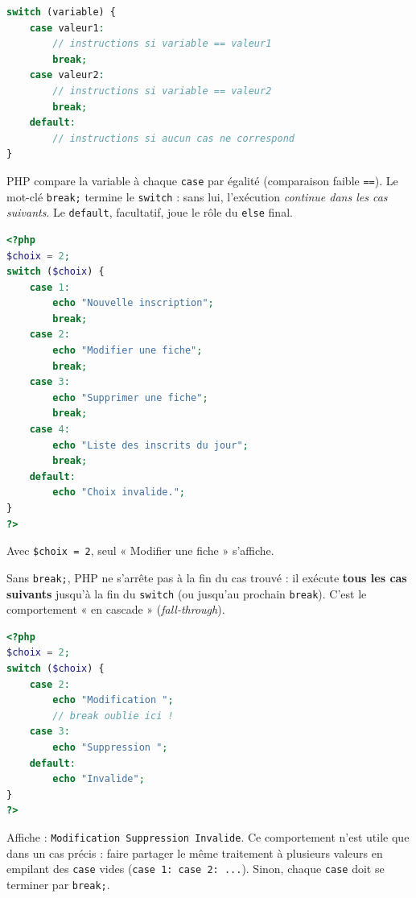 \documentclass[11pt]{article}
\begin{document}
\begin{propriete}
\begin{lstlisting}[language=Php]
switch (variable) {
    case valeur1:
        // instructions si variable == valeur1
        break;
    case valeur2:
        // instructions si variable == valeur2
        break;
    default:
        // instructions si aucun cas ne correspond
}
\end{lstlisting}
PHP compare la variable à chaque \texttt{case} par égalité (comparaison faible \texttt{==}). Le mot-clé \texttt{break;} termine le \texttt{switch} : sans lui, l'exécution \emph{continue dans les cas suivants}. Le \texttt{default}, facultatif, joue le rôle du \texttt{else} final.
\end{propriete}

\begin{exemplebox}
\begin{lstlisting}[language=Php]
<?php
$choix = 2;
switch ($choix) {
    case 1:
        echo "Nouvelle inscription";
        break;
    case 2:
        echo "Modifier une fiche";
        break;
    case 3:
        echo "Supprimer une fiche";
        break;
    case 4:
        echo "Liste des inscrits du jour";
        break;
    default:
        echo "Choix invalide.";
}
?>
\end{lstlisting}
Avec \texttt{\$choix = 2}, seul « Modifier une fiche » s'affiche.
\end{exemplebox}

\begin{attention}
Sans \texttt{break;}, PHP ne s'arrête pas à la fin du cas trouvé : il exécute \textbf{tous les cas suivants} jusqu'à la fin du \texttt{switch} (ou jusqu'au prochain \texttt{break}). C'est le comportement « en cascade » (\emph{fall-through}).
\begin{lstlisting}[language=Php]
<?php
$choix = 2;
switch ($choix) {
    case 2:
        echo "Modification ";
        // break oublie ici !
    case 3:
        echo "Suppression ";
    default:
        echo "Invalide";
}
?>
\end{lstlisting}
Affiche : \texttt{Modification Suppression Invalide}. Ce comportement n'est utile que dans un cas précis : faire partager le même traitement à plusieurs valeurs en empilant des \texttt{case} vides (\texttt{case 1: case 2: ...}). Sinon, chaque \texttt{case} doit se terminer par \texttt{break;}.
\end{attention}
\end{document}
